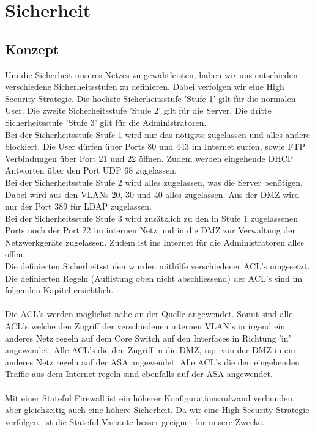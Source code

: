 \documentclass[11pt,a4paper,parskip=half]{scrartcl}
\begin{document}
\section{Sicherheit}
\subsection{Konzept}
Um die Sicherheit unseres Netzes zu gewähtleisten, haben wir uns entschieden verschiedene Sicherheitsstufen zu definieren. Dabei verfolgen wir eine High Security Strategie. Die höchste Sicherheitsstufe 'Stufe 1' gilt für die normalen User. Die zweite Sicherheitsstufe 'Stufe 2' gilt für die Server. Die dritte Sicherheitsstufe 'Stufe 3' gilt für die Administratoren.\\
Bei der Sicherheitsstufe Stufe 1 wird nur das nötigste zugelassen und alles andere blockiert. Die User dürfen über Ports 80 und 443 im Internet surfen, sowie FTP Verbindungen über Port 21 und 22 öffnen. Zudem werden eingehende DHCP Antworten über den Port UDP 68 zugelassen.\\
Bei der Sicherheitsstufe Stufe 2 wird alles zugelassen, was die Server benötigen. Dabei wird aus den VLANs 20, 30 und 40 alles zugelassen. Aus der DMZ wird nur der Port 389 für LDAP zugelassen.\\
Bei der Sicherheitsstufe Stufe 3 wird zusätzlich zu den in Stufe 1 zugelassenen Ports noch der Port 22 im internen Netz und in die DMZ zur Verwaltung der Netzwerkgeräte zugelassen. Zudem ist ins Internet für die Administratoren alles offen.\\
Die definierten Sicherheitsstufen wurden mithilfe verschiedener ACL's umgesetzt. Die definierten Regeln (Auflistung oben nicht abschliessend) der ACL's sind im folgenden Kapitel ersichtlich.\\
\\
Die ACL's werden möglichst nahe an der Quelle angewendet. Somit sind alle ACL's welche den Zugriff der verschiedenen internen VLAN's in irgend ein anderes Netz regeln auf dem Core Switch auf den Interfaces in Richtung 'in' angewendet. Alle ACL's die den Zugriff in die DMZ, rsp. von der DMZ in ein anderes Netz regeln auf der ASA angewendet. Alle ACL's die den eingehenden Traffic aus dem Internet regeln sind ebenfalls auf der ASA angewendet.\\
\\
Mit einer Stateful Firewall ist ein höherer Konfigurationsaufwand verbunden, aber gleichzeitig auch eine höhere Sicherheit. Da wir eine High Security Strategie verfolgen, ist die Stateful Variante besser geeignet für unsere Zwecke.\\
\end{document}
